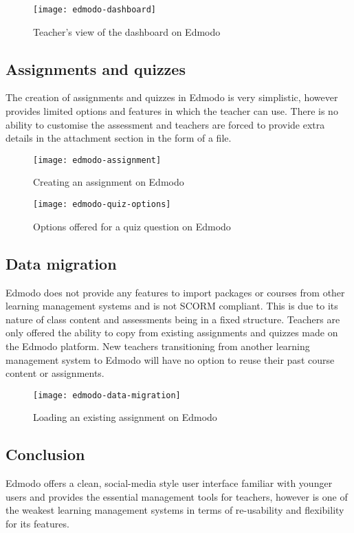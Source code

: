 \begin{figure}[h!]
\centering
\texttt{[image: edmodo-dashboard]}
\caption{Teacher's view of the dashboard on Edmodo}
\end{figure}


\subsection{Assignments and quizzes}
The creation of assignments and quizzes in Edmodo is very simplistic, however provides limited options and features in which the teacher can use. There is no ability to customise the assessment and teachers are forced to provide extra details in the attachment section in the form of a file.

\begin{figure}[h!]
\centering
\texttt{[image: edmodo-assignment]}
\caption{Creating an assignment on Edmodo}
\end{figure}

\begin{figure}[h!]
\centering
\texttt{[image: edmodo-quiz-options]}
\caption{Options offered for a quiz question on Edmodo}
\end{figure}

\subsection{Data migration}
Edmodo does not provide any features to import packages or courses from other learning management systems and is not SCORM compliant\cite{scormExplained}. This is due to its nature of class content and assessments being in a fixed structure. Teachers are only offered the ability to copy from existing assignments and quizzes made on the Edmodo platform. New teachers transitioning from another learning management system to Edmodo will have no option to reuse their past course content or assignments.

\begin{figure}[h!]
\centering
\texttt{[image: edmodo-data-migration]}
\caption{Loading an existing assignment on Edmodo}
\end{figure}

\subsection{Conclusion}
Edmodo offers a clean, social-media style user interface familiar with younger users and provides the essential management tools for teachers, however is one of the weakest learning management systems in terms of re-usability and flexibility for its features.